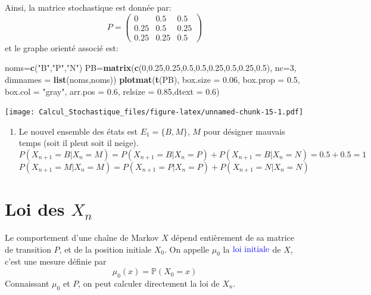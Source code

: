 \documentclass[
]{book}
\newenvironment{Shaded}{\begin{snugshade}}{\end{snugshade}}
\newcommand{\DataTypeTok}[1]{\textcolor[rgb]{0.13,0.29,0.53}{#1}}
\newcommand{\DecValTok}[1]{\textcolor[rgb]{0.00,0.00,0.81}{#1}}
\newcommand{\FloatTok}[1]{\textcolor[rgb]{0.00,0.00,0.81}{#1}}
\newcommand{\KeywordTok}[1]{\textcolor[rgb]{0.13,0.29,0.53}{\textbf{#1}}}
\newcommand{\NormalTok}[1]{#1}
\newcommand{\StringTok}[1]{\textcolor[rgb]{0.31,0.60,0.02}{#1}}
\providecommand{\tightlist}{%
  \setlength{\itemsep}{0pt}\setlength{\parskip}{0pt}}
\theoremstyle{definition}
\theoremstyle{definition}
\theoremstyle{definition}
\theoremstyle{remark}
\begin{document}
Ainsi, la matrice stochastique est donnée par:
\[
  P=\left( 
  \begin{array}{ccc}
  0 & 0.5 & 0.5\\
  0.25 & 0.5 & 0.25\\
  0.25 & 0.25 & 0.5
  \end{array}
  \right)
  \]
et le graphe orienté associé est:

\begin{Shaded}
\begin{Highlighting}[]
\NormalTok{noms=}\KeywordTok{c}\NormalTok{(}\StringTok{"B"}\NormalTok{,}\StringTok{"P"}\NormalTok{,}\StringTok{"N"}\NormalTok{)}
\NormalTok{PB=}\KeywordTok{matrix}\NormalTok{(}\KeywordTok{c}\NormalTok{(}\DecValTok{0}\NormalTok{,}\FloatTok{0.25}\NormalTok{,}\FloatTok{0.25}\NormalTok{,}\FloatTok{0.5}\NormalTok{,}\FloatTok{0.5}\NormalTok{,}\FloatTok{0.25}\NormalTok{,}\FloatTok{0.5}\NormalTok{,}\FloatTok{0.25}\NormalTok{,}\FloatTok{0.5}\NormalTok{), }\DataTypeTok{nc=}\DecValTok{3}\NormalTok{,}
          \DataTypeTok{dimnames =} \KeywordTok{list}\NormalTok{(noms,noms))}
\KeywordTok{plotmat}\NormalTok{(}\KeywordTok{t}\NormalTok{(PB), }\DataTypeTok{box.size =} \FloatTok{0.06}\NormalTok{, }\DataTypeTok{box.prop =} \FloatTok{0.5}\NormalTok{, }\DataTypeTok{box.col =} \StringTok{"gray"}\NormalTok{, }
          \DataTypeTok{arr.pos =} \FloatTok{0.6}\NormalTok{, }\DataTypeTok{relsize =} \FloatTok{0.85}\NormalTok{,}\DataTypeTok{dtext =} \FloatTok{0.6}\NormalTok{)}
\end{Highlighting}
\end{Shaded}

\texttt{[image: Calcul\_Stochastique\_files/figure-latex/unnamed-chunk-15-1.pdf]}

\begin{enumerate}
\def\labelenumi{\arabic{enumi}.}
\setcounter{enumi}{1}
\tightlist
\item
  Le nouvel ensemble des états est \(E_1=\{B, M \}\), \(M\) pour désigner mauvais temps (soit il pleut soit il neige).
  \[P(X_{n+1}=B|X_n=M)=P(X_{n+1}=B|X_n=P)+P(X_{n+1}=B|X_n=N)=0.5+0.5=1\]
  \[P(X_{n+1}=M|X_n=M)=P(X_{n+1}=P|X_n=P)+P(X_{n+1}=N|X_n=N) \]
\end{enumerate}

\hypertarget{loi-des-x_n}{%
\section{\texorpdfstring{Loi des \(X_n\)}{Loi des X\_n}}\label{loi-des-x_n}}

Le comportement d'une chaîne de Markov \(X\) dépend entièrement de sa matrice de transition \(P\), et de la position initiale \(X_0\). On appelle \(\mu_0\) la \(\color{blue}{\mathbf{\text{loi initiale}}}\) de \(X\), c'est une mesure définie par
\[
\mu_0(x)=\mathbb{P}(X_0=x)
\]
Connaissant \(\mu_0\) et \(P\), on peut calculer directement la loi de \(X_n\).
\end{document}
